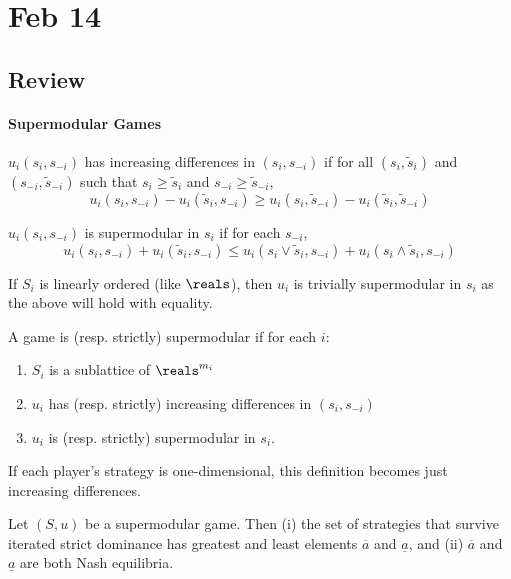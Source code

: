 \documentclass[10pt]{article}
\begin{document}
\section{Feb 14}

\subsection{Review}

\paragraph{Supermodular Games}

\begin{definition}
	$u_i(s_i,s_{-i})$ has increasing differences in $(s_i,s_{-i})$ if for all $(s_i,\tilde{s}_i)$ and $(s_{-i},\tilde{s}_{-i})$ such that $s_i \ge \tilde{s}_i$ and $s_{-i} \ge \tilde{s}_{-i}$,\[u_i(s_i,s_{-i}) - u_i(\tilde{s}_i,s_{-i}) \ge u_i(s_i,\tilde{s}_{-i}) - u_i(\tilde{s}_i,\tilde{s}_{-i})\]
\end{definition}
\begin{definition}
	$u_i(s_i,s_{-i})$ is supermodular in $s_i$ if for each $s_{-i}$,\[u_i(s_i,s_{-i}) + u_i(\tilde{s}_i,s_{-i}) \le u_i(s_i \vee \tilde{s}_i , s_{-i}) + u_i(s_i \wedge \tilde{s}_i , s_{-i})\]
\end{definition}
\begin{remark}
	If $S_i$ is linearly ordered (like $\reals$), then $u_i$ is trivially supermodular in $s_i$ as the above will hold with equality.
\end{remark}
\begin{definition}
	A game is (resp. strictly) supermodular if for each $i$:
	\begin{enumerate}
		\item $S_i$ is a sublattice of $\reals^{m_i}$
		\item $u_i$ has (resp. strictly) increasing differences in $(s_i,s_{-i})$
		\item $u_i$ is (resp. strictly) supermodular in $s_i$.
	\end{enumerate}
\end{definition}
\begin{remark}
	If each player's strategy is one-dimensional, this definition becomes just increasing differences.
\end{remark}

\begin{theorem}
	Let $(S,u)$ be a supermodular game. Then (i) the set of strategies that survive iterated strict dominance has greatest and least elements $\overline{a}$ and $\underline{a}$, and (ii) $\overline{a}$ and $\underline{a}$ are both Nash equilibria.
\end{theorem}
\end{document}
